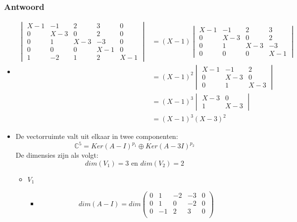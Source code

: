 \documentclass[main.tex]{subfiles}
\begin{document}
\subsubsection*{Antwoord}
\begin{itemize}
\item 
  \[
  \begin{array}{rll}
    \begin{vmatrix}
      X-1 & -1 & 2 & 3 & 0\\
      0 & X-3 & 0 & 2 & 0\\
      0 & 1 & X-3 & -3 & 0\\
      0 & 0 & 0 & X-1 & 0\\
      1 & -2 & 1 & 2 & X-1
    \end{vmatrix}
    &= 
    (X-1) 
    \begin{vmatrix}
      X-1 & -1 & 2 & 3 \\
      0 & X-3 & 0 & 2 \\
      0 & 1 & X-3 & -3 \\
      0 & 0 & 0 & X-1 
    \end{vmatrix} &\\
    &=
    (X-1)^{2}
    \begin{vmatrix}
      X-1 & -1 & 2 \\
      0 & X-3 & 0\\
      0 & 1 & X-3
    \end{vmatrix} &\\
    &= 
    (X-1)^{3}
    \begin{vmatrix}
      X-3 & 0\\
      1 & X-3
    \end{vmatrix} &\\
    &=
    (X-1)^{3}(X-3)^{2}
  \end{array}
  \]
\item De vectorruimte valt uit elkaar in twee componenten:
  \[ \mathbb{C}^{5} = Ker(A-I)^{p_{1}} \oplus Ker(A-3I )^{p_{2}} \]
  De dimensies zijn als volgt:
  \[ dim(V_{1})= 3 \text{ en } dim(V_{2}) = 2\]
  \begin{itemize}
  \item $V_{1}$
    \begin{itemize}
    \item
      \[ dim(A-I) = dim
      \begin{pmatrix}
        0 & 1 & -2 & -3 & 0\\
        0 & 1 & 0 & -2 & 0\\
        0 & -1 & 2 & 3 & 0\\

\end{pmatrix}\]
\end{itemize}
\end{itemize}
\end{itemize}
\end{document}
